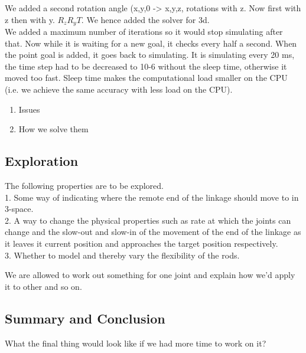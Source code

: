\documentclass[paper=a4, fontsize=11pt]{scrartcl} %
\numberwithin{equation}{section} %
\numberwithin{figure}{section} %
\numberwithin{table}{section} %
\begin{document}
We added a second rotation angle (x,y,0 -> x,y,z, rotations with z. Now first with z then with y. \(R_z R_y T\). We hence added the solver for 3d. \\

We added a maximum number of iterations so it would stop simulating after that. Now while it is waiting for a new goal, it checks every half a second. When the point goal is added, it goes back to simulating. It is simulating every 20 ms, the time step had to be decreased to 10-6 without the sleep time, otherwise it moved too fast. Sleep time makes the computational load smaller on the CPU (i.e. we achieve the same accuracy with less load on the CPU). 





    \begin{enumerate}
    \item Issues
    \item How we solve them
  \end{enumerate}
  
\subsection{Exploration}
The following properties are to be explored.\\
1. Some way of indicating where the remote end of the linkage should move to in 3-space.\\
2. A way to change the physical properties such as rate at which the joints can change and the slow-out and slow-in of the movement of the end of the linkage as it leaves it current position and approaches the target position respectively.\\
3. Whether to model and thereby vary the flexibility of the rods.


We are allowed to work out something for one joint and explain how we'd apply it to other and so on.

\subsection{Summary and Conclusion}
What the final thing would look like if we had more time to work on it?

\end{document}
